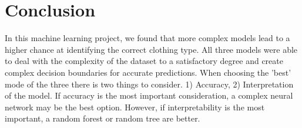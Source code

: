 \section{Conclusion}
In this machine learning project, we found that more complex models lead to a higher chance at identifying the correct clothing type.
All three models were able to deal with the complexity of the dataset to a satisfactory degree and create complex decision boundaries for accurate predictions.
When choosing the 'best' mode of the three there is two things to consider.
1) Accuracy, 2) Interpretation of the model.
If accuracy is the most important consideration, a complex neural network may be the best option.
However, if interpretability is the most important, a random forest or random tree are better.
